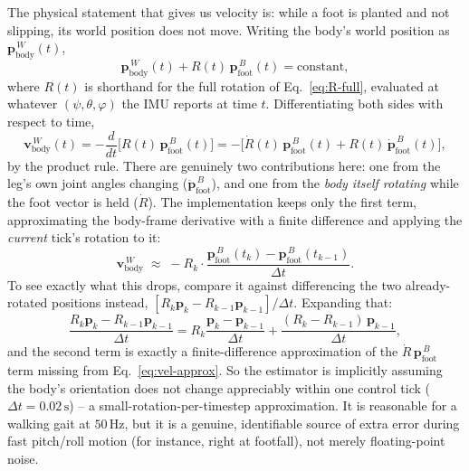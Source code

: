 \documentclass[11pt]{article}
\begin{document}
The physical statement that gives us velocity is: while a foot is planted
and not slipping, its world position does not move. Writing the body's
world position as $\mathbf{p}_{\text{body}}^{\,W}(t)$,
\begin{equation}
\mathbf{p}_{\text{body}}^{\,W}(t) + R(t)\,\mathbf{p}_{\text{foot}}^{\,B}(t) = \text{constant},
\end{equation}
where $R(t)$ is shorthand for the full rotation of Eq.~\eqref{eq:R-full},
evaluated at whatever $(\psi,\theta,\varphi)$ the IMU reports at time $t$.
Differentiating both sides with respect to time,
\begin{equation}
\mathbf{v}_{\text{body}}^{\,W}(t) = -\frac{d}{dt}\Big[R(t)\,\mathbf{p}_{\text{foot}}^{\,B}(t)\Big]
= -\Big[\dot{R}(t)\,\mathbf{p}_{\text{foot}}^{\,B}(t) + R(t)\,\dot{\mathbf{p}}_{\text{foot}}^{\,B}(t)\Big],
\label{eq:product-rule}
\end{equation}
by the product rule. There are genuinely two contributions here: one from
the leg's own joint angles changing ($\dot{\mathbf{p}}_{\text{foot}}^{\,B}$), and
one from the \emph{body itself rotating} while the foot vector is held
($\dot R$). The implementation keeps only the first term, approximating the
body-frame derivative with a finite difference and applying the
\emph{current} tick's rotation to it:
\begin{equation}
\mathbf{v}_{\text{body}}^{\,W} \;\approx\; -R_k \cdot \frac{\mathbf{p}_{\text{foot}}^{\,B}(t_k) - \mathbf{p}_{\text{foot}}^{\,B}(t_{k-1})}{\Delta t}.
\label{eq:vel-approx}
\end{equation}
To see exactly what this drops, compare it against differencing the two
already-rotated positions instead, $[R_k\mathbf{p}_k - R_{k-1}\mathbf{p}_{k-1}]/\Delta t$.
Expanding that:
\begin{equation}
\frac{R_k\mathbf{p}_k - R_{k-1}\mathbf{p}_{k-1}}{\Delta t}
= R_k\frac{\mathbf{p}_k - \mathbf{p}_{k-1}}{\Delta t} + \frac{(R_k - R_{k-1})\,\mathbf{p}_{k-1}}{\Delta t},
\end{equation}
and the second term is exactly a finite-difference approximation of the
$\dot R\,\mathbf{p}_{\text{foot}}^{\,B}$ term missing from
Eq.~\eqref{eq:vel-approx}. So the estimator is implicitly assuming the
body's orientation does not change appreciably within one control tick
($\Delta t = 0.02\,\text{s}$) -- a small-rotation-per-timestep
approximation. It is reasonable for a walking gait at $50\,\text{Hz}$, but
it is a genuine, identifiable source of extra error during fast pitch/roll
motion (for instance, right at footfall), not merely floating-point noise.
\end{document}

